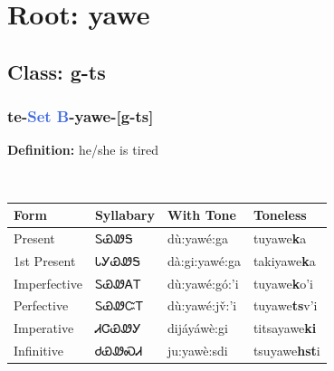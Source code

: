 \needspace{4in}
\section*{Root: yawe}
\nopagebreak
{}
\needspace{3in}
\subsection*{Class: g-ts}
\nopagebreak
\needspace{2in}
\subsubsection*{te{-}\textcolor{RoyalBlue}{Set B}{-}\textbf{yawe}{-}[g-ts]}
\nopagebreak
\textbf{Definition: } he/she is tired
\\[0.5em]
\begin{tabularx}{\textwidth}{l X X X}%
\toprule%
\textbf{Form}&\textbf{Syllabary}&\textbf{With Tone}&\textbf{Toneless}\\%
\midrule%
Present&ᏚᏯᏪᎦ&dù:yawé:ga&tuyawe\textbf{k}a\\%
1st Present&ᏓᎩᏯᏪᎦ&dà:gi:yawé:ga&takiyawe\textbf{k}a\\%
Imperfective&ᏚᏯᏪᎪᎢ&dù:yawé:gó:’i&tuyawe\textbf{k}o'i\\%
Perfective&ᏚᏯᏪᏨᎢ&dù:yawé:jv̌:’i&tuyawe\textbf{ts}v'i\\%
Imperative&ᏗᏣᏯᏪᎩ&dijáyáwè:gi&titsayawe\textbf{ki}\\%
Infinitive&ᏧᏯᏪᏍᏗ&ju:yawè:sdi&tsuyawe\textbf{hst}i\\%
\bottomrule%
\end{tabularx}
\\[1em]